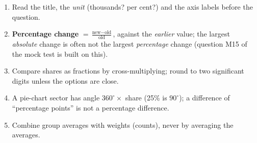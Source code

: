 \documentclass[10pt,a4paper,openany,oneside]{report}
\begin{document}
\begin{tipbox}
\begin{enumerate}[nosep,leftmargin=*]
\item Read the title, the \emph{unit} (thousands? per cent?) and the axis labels before the question.
\item \textbf{Percentage change} $=\frac{\text{new}-\text{old}}{\text{old}}$, against the \emph{earlier} value; the largest \emph{absolute} change is often not the largest \emph{percentage} change (question M15 of the mock test is built on this).
\item Compare shares as fractions by cross-multiplying; round to two significant digits unless the options are close.
\item A pie-chart sector has angle $360^\circ\times$ share (25\% is $90^\circ$); a difference of ``percentage points'' is not a percentage difference.
\item Combine group averages with weights (counts), never by averaging the averages.
\end{enumerate}
\end{tipbox}
\end{document}
